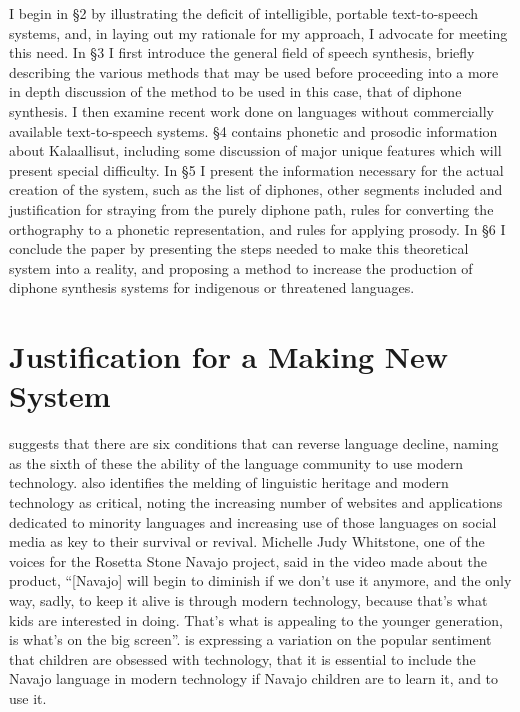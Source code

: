 \documentclass[12pt]{article}
\begin{document}
I begin in \S 2 by illustrating the deficit of intelligible, portable text-to-speech systems, and, in laying out my rationale for my approach, I advocate for meeting this need. In \S 3 I first introduce the general field of speech synthesis, briefly describing the various methods that may be used before proceeding into a more in depth discussion of the method to be used in this case, that of diphone synthesis. I then examine recent work done on languages without commercially available text-to-speech systems. \S 4 contains phonetic and prosodic information about Kalaallisut, including some discussion of major unique features which will present special difficulty. In \S 5 I present the information necessary for the actual creation of the system, such as the list of diphones, other segments included and justification for straying from the purely diphone path, rules for converting the orthography to a phonetic representation, and rules for applying prosody. In \S 6 I conclude the paper by presenting the steps needed to make this theoretical system into a reality, and proposing a method to increase the production of diphone synthesis systems for indigenous or threatened languages. \par

\section{Justification for a Making New System}

\citet{crystal} suggests that there are six conditions that can reverse language decline, naming as the sixth of these the ability of the language community to use modern technology. \citet{endng} also identifies the melding of linguistic heritage and modern technology as critical, noting the increasing number of websites and applications dedicated to minority languages and increasing use of those languages on social media as key to their survival or revival. Michelle Judy Whitstone, one of the voices for the Rosetta Stone Navajo project, said in the video made about the product, ``[Navajo] will begin to diminish if we don't use it anymore, and the only way, sadly, to keep it alive is through modern technology, because that's what kids are interested in doing. That's what is appealing to the younger generation, is what's on the big screen''. \citeauthor{rosetta} is expressing a variation on the popular sentiment that children are obsessed with technology, that it is essential to include the Navajo language in modern technology if Navajo children are to learn it, and to use it. \par
\end{document}
